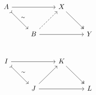 \documentclass{standalone}
\begin{document}
\pagecolor{bg-color}
\color{fg-color}
\(
\begin{tikzcd}[row sep=6ex]
  A \arrow[rr] \arrow[rightarrowtail,dr,"\sim"] &  &
  X \arrow[twoheadrightarrow,dr] &  \\
  & B \arrow[rr] \arrow[dashrightarrow,ur] &  & Y \\
  I \arrow[rr] \arrow[rightarrowtail,dr,"\sim"] &  &
  K \arrow[twoheadrightarrow,dr] &  \\
  & J \arrow[rr] \arrow[ur] &  & L
\end{tikzcd}
\)
\end{document}
